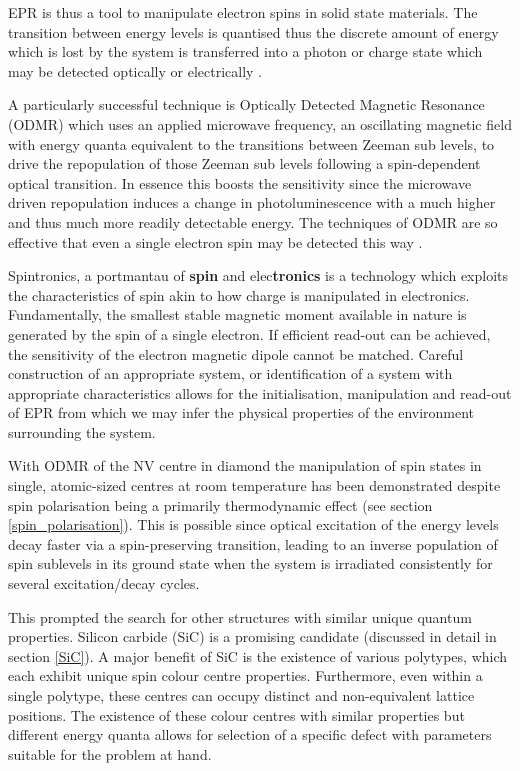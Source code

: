 EPR is thus a tool to manipulate electron spins in solid state materials. The transition between energy levels is quantised thus the discrete amount of energy which is lost by the system is transferred into a photon or charge state which may be detected optically or electrically \cite{carrington1967introduction}.

A particularly successful technique is Optically Detected Magnetic Resonance (ODMR) which uses an applied microwave frequency, an oscillating magnetic field with energy quanta equivalent to the transitions between Zeeman sub levels, to drive the repopulation of those Zeeman sub levels following a spin-dependent optical transition.
In essence this boosts the sensitivity since the microwave driven repopulation induces a change in photoluminescence with a much higher and thus much more readily detectable energy. The techniques of ODMR are so effective that even a single electron spin may be detected this way \cite{Khler1993}.

Spintronics, a portmantau of \textbf{spin} and elec\textbf{tronics} is a technology which exploits the characteristics of spin akin to how charge is manipulated in electronics. Fundamentally, the smallest stable magnetic moment available in nature is generated by the spin of a single electron. If efficient read-out can be achieved, the sensitivity of the electron magnetic dipole cannot be matched. 
Careful construction of an appropriate system, or identification of a system with appropriate characteristics allows for the initialisation, manipulation and read-out of EPR from which we may infer the physical properties of the environment surrounding the system. 

With ODMR of the NV centre in diamond the manipulation of spin states in single, atomic-sized centres at room temperature has been demonstrated \cite{Levine} despite spin polarisation being a primarily thermodynamic effect (see section \ref{spin_polarisation}).
This is possible since optical excitation of the energy levels decay faster via a spin-preserving transition, leading to an inverse population of spin sublevels in its ground state when the system is irradiated consistently for several excitation/decay cycles.

This prompted the search for other structures with similar unique quantum properties. Silicon carbide (SiC) is a promising candidate (discussed in detail in section \ref{SiC}). A major benefit of SiC is the existence of various polytypes, which each exhibit unique spin colour centre properties. Furthermore, even within a single polytype, these centres can occupy distinct and non-equivalent lattice positions.
The existence of these colour centres with similar properties but different energy quanta allows for selection of a specific defect with parameters suitable for the problem at hand. 

